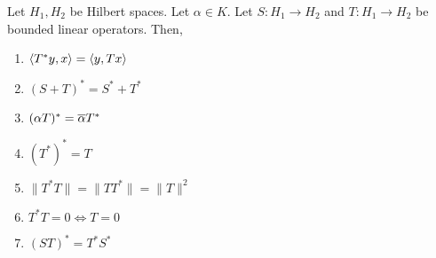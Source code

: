 \begin{theorem}
	Let $H_1,H_2$ be Hilbert spaces.
	Let $\alpha \in K$.
	Let $S : H_1 \to H_2$ and $T : H_1 \to H_2$ be bounded linear operators.
	Then,
	\begin{enumerate}
	\item $\left\langle T^\ast y,x \right\rangle = \left\langle y,Tx \right\rangle$
	\item $(S+T)^\ast = S^\ast + T^\ast$
	\item $(\alpha T)^\ast = \overline{\alpha} T^\ast$
	\item $(T^\ast)^\ast = T$
	\item $\|T^\ast T\| = \|T T^\ast\| = \|T\|^2$
	\item $T^\ast T = 0 \iff T = 0$
	\item $(ST)^\ast = T^\ast S^\ast$
	\end{enumerate}
\end{theorem}
